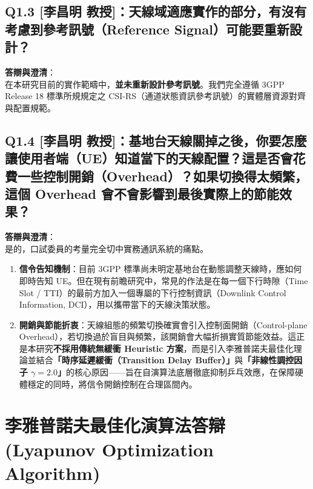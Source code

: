 \subsection*{Q1.3 [李昌明 教授]：天線域適應實作的部分，有沒有考慮到參考訊號（Reference Signal）可能要重新設計？}
\textbf{答辯與澄清}：\\
在本研究目前的實作範疇中，\textbf{並未重新設計參考訊號}。我們完全遵循 3GPP Release 18 標準所規規定之 CSI-RS（通道狀態資訊參考訊號）的實體層資源對齊與配置規範。

\subsection*{Q1.4 [李昌明 教授]：基地台天線關掉之後，你要怎麼讓使用者端（UE）知道當下的天線配置？這是否會花費一些控制開銷（Overhead）？如果切換得太頻繁，這個 Overhead 會不會影響到最後實際上的節能效果？}
\textbf{答辯與澄清}：\\
是的，口試委員的考量完全切中實務通訊系統的痛點。
\begin{enumerate}
    \item \textbf{信令告知機制}：目前 3GPP 標準尚未明定基地台在動態調整天線時，應如何即時告知 UE。但在現有前瞻研究中，常見的作法是在每一個下行時隙（Time Slot / TTI）的最前方加入一個專屬的下行控制資訊（Downlink Control Information, DCI），用以攜帶當下的天線決策狀態。
    \item \textbf{開銷與節能折衷}：天線組態的頻繁切換確實會引入控制面開銷（Control-plane Overhead），若切換過於盲目與頻繁，該開銷會大幅折損實質節能效益。這正是本研究\textbf{不採用傳統無緩衝 Heuristic 方案}，而是引入李雅普諾夫最佳化理論並結合\textbf{「時序延遲緩衝（Transition Delay Buffer）」}與\textbf{「非線性調控因子 $\gamma = 2.0$」}的核心原因——旨在自演算法底層徹底抑制乒乓效應，在保障硬體穩定的同時，將信令開銷控制在合理區間內。
\end{enumerate}

\section{李雅普諾夫最佳化演算法答辯 (Lyapunov Optimization Algorithm)}

